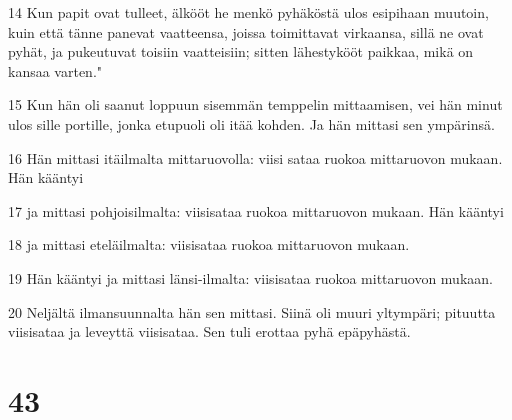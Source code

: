 \par 14 Kun papit ovat tulleet, älkööt he menkö pyhäköstä ulos esipihaan muutoin, kuin että tänne panevat vaatteensa, joissa toimittavat virkaansa, sillä ne ovat pyhät, ja pukeutuvat toisiin vaatteisiin; sitten lähestykööt paikkaa, mikä on kansaa varten."
\par 15 Kun hän oli saanut loppuun sisemmän temppelin mittaamisen, vei hän minut ulos sille portille, jonka etupuoli oli itää kohden. Ja hän mittasi sen ympärinsä.
\par 16 Hän mittasi itäilmalta mittaruovolla: viisi sataa ruokoa mittaruovon mukaan. Hän kääntyi
\par 17 ja mittasi pohjoisilmalta: viisisataa ruokoa mittaruovon mukaan. Hän kääntyi
\par 18 ja mittasi eteläilmalta: viisisataa ruokoa mittaruovon mukaan.
\par 19 Hän kääntyi ja mittasi länsi-ilmalta: viisisataa ruokoa mittaruovon mukaan.
\par 20 Neljältä ilmansuunnalta hän sen mittasi. Siinä oli muuri yltympäri; pituutta viisisataa ja leveyttä viisisataa. Sen tuli erottaa pyhä epäpyhästä.

\chapter{43}

